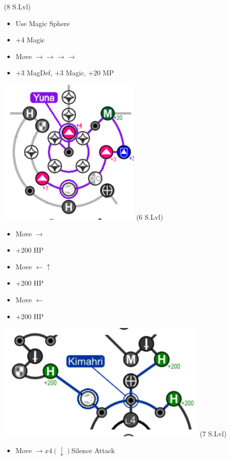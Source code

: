 \begin{spheregrid}
  \begin{itemize}
    \yunaf (8 S.Lvl)
    \begin{itemize}
      \item Use Magic Sphere
      \item +4 Magic
      \item Move $\rightarrow\rightarrow\rightarrow\rightarrow$
      \item +3 MagDef, +3 Magic, +20 MP
    \end{itemize}
    \includegraphics{graphics/yunammr}
    \kimahrif (6 S.Lvl)
    \begin{itemize}
      \item Move $\rightarrow$
      \item +200 HP
      \item Move $\leftarrow\uparrow$
      \item +200 HP
      \item Move $\leftarrow$
      \item +200 HP
    \end{itemize}
    \includegraphics{graphics/kimahrimmr}
    \wakkaf (7 S.Lvl)
    \begin{itemize}
      \item Move $\rightarrow x4 (\downarrow)$Silence Attack

\end{itemize}
\end{itemize}
\end{spheregrid}
